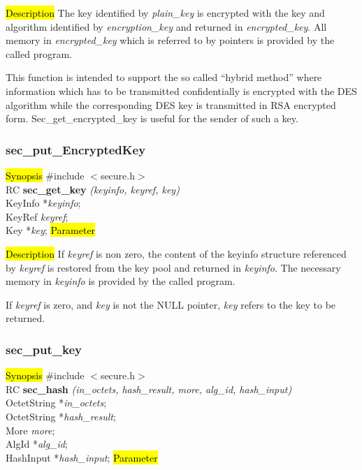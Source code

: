 

\hl{Description}
The key identified by {\em plain\_key} is encrypted with the key and algorithm identified by
{\em encryption\_key} and returned in 
{\em encrypted\_key}. All memory in {\em encrypted\_key} which is referred to by pointers
is provided by the called program. 

This function is intended to support the so called ``hybrid method'' where information which
has to be transmitted confidentially is encrypted with the DES algorithm while the corresponding DES key
is transmitted in RSA encrypted form. Sec\_get\_encrypted\_key is useful for the sender
of such a key.

\subsubsection{sec\_put\_EncryptedKey}
\label{sec_get_key}
\hl{Synopsis}
\#include $<$secure.h$>$ \\ [0.5cm]
RC {\bf sec\_get\_key} {\em (keyinfo, keyref, key)} \\
KeyInfo *{\em keyinfo}; \\
KeyRef {\em keyref}; \\
Key *{\em key};
\hl{Parameter}



\hl{Description}
If {\em keyref} is non zero, the content of the keyinfo structure referenced 
by {\em keyref} is restored from the key pool and returned 
in {\em keyinfo}. The necessary memory in {\em keyinfo} is provided
by the called program. 

If {\em keyref} is zero, and {\em key} is not the NULL pointer, {\em key}
refers to the key to be returned.

\subsubsection{sec\_put\_key}
\label{sec_hash}
\hl{Synopsis}
\#include $<$secure.h$>$ \\ [0.5cm]
RC {\bf sec\_hash} {\em (in\_octets, hash\_result, more, alg\_id, hash\_input)} \\
OctetString *{\em in\_octets}; \\
OctetString *{\em hash\_result}; \\
More {\em more}; \\
AlgId *{\em alg\_id}; \\
HashInput *{\em hash\_input};
\hl{Parameter}

